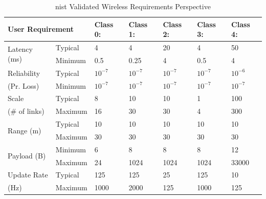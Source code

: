 \begin{table}[!tb]
	\centering
	\caption{\gls{nist} Validated Wireless Requirements Perspective}
	\label{soa:nist-reqts-persp}%
	
	\begin{tabular}{|p{5.715em}|p{4.855em}|l|l|l|l|l|}
		\toprule
		\multicolumn{2}{|p{10.57em}|}{\textbf{User Requirement}} & \multicolumn{1}{p{4.355em}|}{\textbf{Class 0:}} & \multicolumn{1}{p{4.355em}|}{\textbf{Class 1:}} & \multicolumn{1}{p{4.355em}|}{\textbf{Class 2:}} & \multicolumn{1}{p{4.355em}|}{\textbf{Class 3:}} & \multicolumn{1}{p{4.355em}|}{\textbf{Class 4:}} \\
		\midrule
		\multirow{2}[4]{*}{Latency (ms)} & Typical & 4     & 4     & 20    & 4     & 50 \\
		\cmidrule{2-7}\multicolumn{1}{|l|}{} & Minimum & 0.5   & 0.25  & 4     & 0.5   & 4 \\
		\midrule
		Reliability & Typical & \multicolumn{1}{p{4.355em}|}{$10^{-7}$} & \multicolumn{1}{p{4.355em}|}{$10^{-7}$} & \multicolumn{1}{p{4.355em}|}{$10^{-7}$} & \multicolumn{1}{p{4.355em}|}{$10^{-7}$} & \multicolumn{1}{p{4.355em}|}{$10^{-6}$} \\
		\cmidrule{2-7}(Pr. Loss) & Minimum & \multicolumn{1}{p{4.355em}|}{$10^{-7}$} & \multicolumn{1}{p{4.355em}|}{$10^{-7}$} & \multicolumn{1}{p{4.355em}|}{$10^{-7}$} & \multicolumn{1}{p{4.355em}|}{$10^{-7}$} & \multicolumn{1}{p{4.355em}|}{$10^{-7}$} \\
		\midrule
		Scale & Typical & 8     & 10    & 10    & 1     & 100 \\
		\cmidrule{2-7}(\# of links) & Maximum & 16    & 30    & 30    & 4     & 300 \\
		\midrule
		\multirow{2}[4]{*}{Range (m)} & Typical & 10    & 10    & 10    & 10    & 10 \\
		\cmidrule{2-7}\multicolumn{1}{|l|}{} & Maximum & 30    & 30    & 30    & 30    & 30 \\
		\midrule
		\multirow{2}[4]{*}{Payload (B)} & Minimum & 6     & 8     & 8     & 8     & 12 \\
		\cmidrule{2-7}\multicolumn{1}{|l|}{} & Maximum  & 24    & 1024  & 1024  & 1024  & 33000 \\
		\midrule
		Update Rate & Typical & 125   & 125   & 25    & 125   & 10 \\
		\cmidrule{2-7}(Hz)  & Maximum & 1000  & 2000  & 125   & 1000  & 125 \\
		\bottomrule
	\end{tabular}%
\end{table}%

